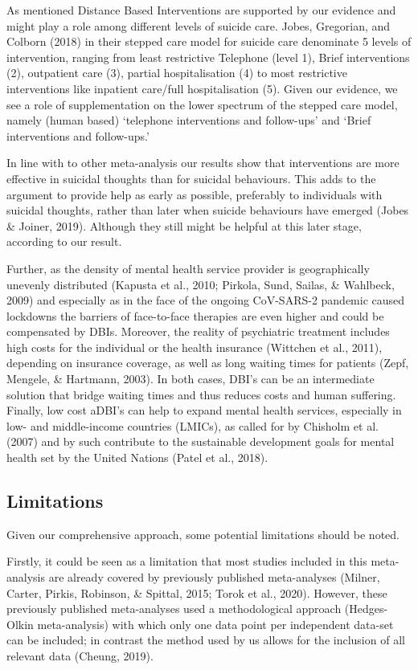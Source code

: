\documentclass[
  english,
  man]{apa6}
\begin{document}
As mentioned Distance Based Interventions are supported by our evidence and might play a role among different levels of suicide care. Jobes, Gregorian, and Colborn (2018) in their stepped care model for suicide care denominate 5 levels of intervention, ranging from least restrictive Telephone (level 1), Brief interventions (2), outpatient care (3), partial hospitalisation (4) to most restrictive interventions like inpatient care/full hospitalisation (5). Given our evidence, we see a role of supplementation on the lower spectrum of the stepped care model, namely (human based) `telephone interventions and follow-ups' and `Brief interventions and follow-ups.'

In line with to other meta-analysis our results show that interventions are more effective in suicidal thoughts than for suicidal behaviours. This adds to the argument to provide help as early as possible, preferably to individuals with suicidal thoughts, rather than later when suicide behaviours have emerged (Jobes \& Joiner, 2019). Although they still might be helpful at this later stage, according to our result.

Further, as the density of mental health service provider is geographically unevenly distributed (Kapusta et al., 2010; Pirkola, Sund, Sailas, \& Wahlbeck, 2009) and especially as in the face of the ongoing CoV-SARS-2 pandemic caused lockdowns the barriers of face-to-face therapies are even higher and could be compensated by DBIs. Moreover, the reality of psychiatric treatment includes high costs for the individual or the health insurance (Wittchen et al., 2011), depending on insurance coverage, as well as long waiting times for patients (Zepf, Mengele, \& Hartmann, 2003). In both cases, DBI's can be an intermediate solution that bridge waiting times and thus reduces costs and human suffering. Finally, low cost aDBI's can help to expand mental health services, especially in low- and middle-income countries (LMICs), as called for by Chisholm et al. (2007) and by such contribute to the sustainable development goals for mental health set by the United Nations (Patel et al., 2018).

\hypertarget{limitations}{%
\subsection{Limitations}\label{limitations}}

Given our comprehensive approach, some potential limitations should be noted.

Firstly, it could be seen as a limitation that most studies included in this meta-analysis are already covered by previously published meta-analyses (Milner, Carter, Pirkis, Robinson, \& Spittal, 2015; Torok et al., 2020). However, these previously published meta-analyses used a methodological approach (Hedges-Olkin meta-analysis) with which only one data point per independent data-set can be included; in contrast the method used by us allows for the inclusion of all relevant data (Cheung, 2019).
\end{document}
